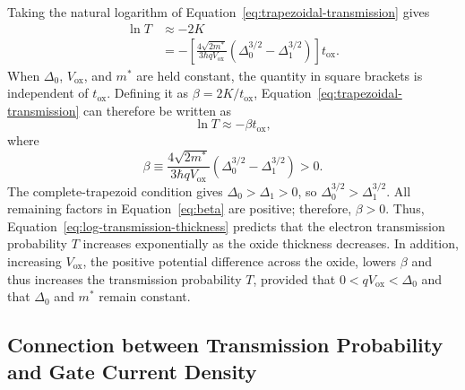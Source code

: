\documentclass[12pt]{article}
\begin{document}
Taking the natural logarithm of Equation~\eqref{eq:trapezoidal-transmission} gives
\begin{align*}
    \ln T
    &\approx -2K\\
    &=-\left[
        \frac{4\sqrt{2m^*}}{3\hbar qV_{\mathrm{ox}}}
        \left(
            \Delta_0^{3/2}-\Delta_1^{3/2}
        \right)
    \right]t_{\mathrm{ox}}.
\end{align*}
When \(\Delta_0\), \(V_{\mathrm{ox}}\), and \(m^*\) are held constant, the quantity in square brackets is independent of \(t_{\mathrm{ox}}\). Defining it as \(\beta=2K/t_{\mathrm{ox}}\), Equation~\eqref{eq:trapezoidal-transmission} can therefore be written as
\begin{equation}
    \ln T\approx-\beta t_{\mathrm{ox}},
    \label{eq:log-transmission-thickness}
\end{equation}
where
\begin{equation}
    \beta\equiv
    \frac{4\sqrt{2m^*}}
    {3\hbar qV_{\mathrm{ox}}}
    \left(
        \Delta_0^{3/2}-\Delta_1^{3/2}
    \right)>0.
    \label{eq:beta}
\end{equation}
The complete-trapezoid condition gives \(\Delta_0>\Delta_1>0\), so \(\Delta_0^{3/2}>\Delta_1^{3/2}\). All remaining factors in Equation~\eqref{eq:beta} are positive; therefore, \(\beta>0\).
Thus, Equation~\eqref{eq:log-transmission-thickness} predicts that the electron transmission probability \(T\) increases exponentially as the oxide thickness decreases. In addition, increasing \(V_{\mathrm{ox}}\), the positive potential difference across the oxide, lowers \(\beta\) and thus increases the transmission probability \(T\), provided that \(0<qV_{\mathrm{ox}}<\Delta_0\) and that \(\Delta_0\) and \(m^*\) remain constant.

\subsection{Connection between Transmission Probability and Gate Current Density}
\end{document}
